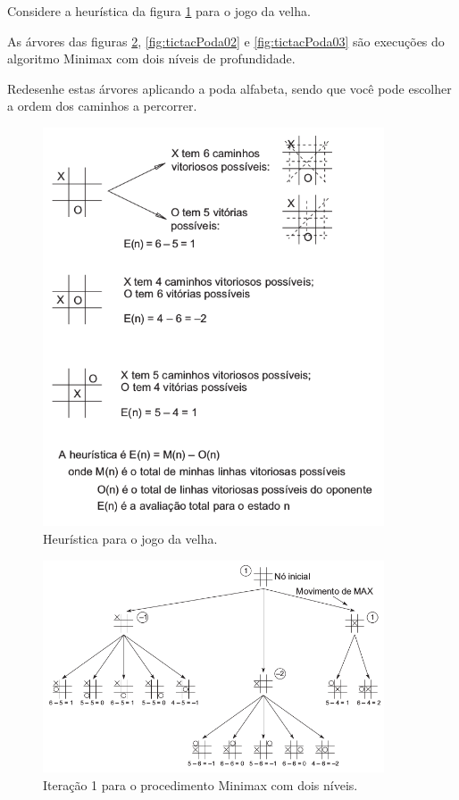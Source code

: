 \documentclass[12pt]{exam}
\begin{document}
\begin{questions}
\question Considere a heurística da figura \ref{fig:tictacHeu} para o jogo da velha. 

As árvores das figuras \ref{fig:tictacPoda01}, \ref{fig:tictacPoda02} e \ref{fig:tictacPoda03} são execuções do algoritmo Minimax com dois níveis de profundidade.

Redesenhe estas árvores aplicando a poda alfabeta, sendo que você pode escolher a ordem dos caminhos a percorrer.

\begin{figure}[h]
    \centering
    \includegraphics[width=0.90\textwidth]{tictacHeu}
    \caption{Heurística para o jogo da velha.}
    \label{fig:tictacHeu}
\end{figure}

\begin{figure}[h]
    \centering
    \includegraphics[width=0.90\textwidth]{tictacPoda01}
    \caption{Iteração 1 para o procedimento Minimax com dois níveis.}
    \label{fig:tictacPoda01}
\end{figure}


\end{questions}
\end{document}
